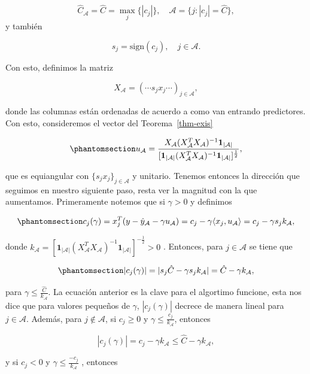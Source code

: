 \documentclass[
  letterpaper,
  DIV=11,
  numbers=noendperiod]{scrreprt}
\theoremstyle{plain}
\theoremstyle{definition}
\theoremstyle{remark}
\begin{document}
\[
\hat C_\mathcal A=\hat C=\max_j\{|c_j|\},\quad \mathcal A=\{j:|c_j|=\hat C\},
\]y también

\[
s_j=\text{sign}(c_j),\quad j\in \mathcal A.
\]

Con esto, definimos la matriz

\[ X_{\mathcal A}=(\cdots s_jx_j\cdots)_{j\in \mathcal A}, \]

donde las columnas están ordenadas de acuerdo a como van entrando
predictores. Con esto, consideremos el vector del Teorema~\ref{thm-exis}

\begin{equation}\phantomsection\label{eq-ua}{ u_\mathcal A =\frac{X_\mathcal A(X^T_{\mathcal A} X_{\mathcal A})^{-1}\mathbf 1_{|\mathcal A|}}{[\mathbf 1_{|\mathcal A|}(X_{\mathcal A}^TX_{\mathcal A})^{-1}\mathbf 1_{|\mathcal A|}]^{\frac 12}}, }\end{equation}

que es equiangular con \(\{s_jx_j\}_{j\in \mathcal A}\) y unitario.
Tenemos entonces la dirección que seguimos en nuestro siguiente paso,
resta ver la magnitud con la que aumentamos. Primeramente notemos que si
\(\gamma>0\) y definimos

\begin{equation}\phantomsection\label{eq-corrlars}{
c_j(\gamma)=x_j^T(y-\hat y_\mathcal A -\gamma u_\mathcal A)=c_j-\gamma\langle x_j,u_\mathcal A\rangle=c_j-\gamma s_jk_{\mathcal A},
}\end{equation}

donde
\(k_{\mathcal A}=[\mathbf 1_{|\mathcal A|}(X^T_{\mathcal A}X_{\mathcal A})^{-1}\mathbf 1_{|\mathcal A|}]^{-\frac 12}>0\)
. Entonces, para \(j\in \mathcal A\) se tiene que

\begin{equation}\phantomsection\label{eq-clave}{
|c_j(\gamma)|=|s_j \hat C-\gamma s_jk_{\mathcal A}|= \hat C-\gamma k_{\mathcal A},
}\end{equation}

para \(\gamma\leq \frac{\hat C}{k_\mathcal A}\). La ecuación anterior es
la clave para el algortimo funcione, esta nos dice que para valores
pequeños de \(\gamma\), \(|c_j(\gamma)|\) decrece de manera lineal para
\(j\in \mathcal A\). Además, para \(j\notin \mathcal A\), si
\(c_j\geq 0\) y \(\gamma\leq \frac{c_j}{k_\mathcal A}\), entonces

\[
|c_j(\gamma)|=c_j-\gamma k_{\mathcal A}\leq \hat C-\gamma k_{\mathcal A},
\]

y si \(c_j<0\) y \(\gamma\leq \frac{-c_j}{k_{\mathcal A}}\) , entonces
\end{document}
